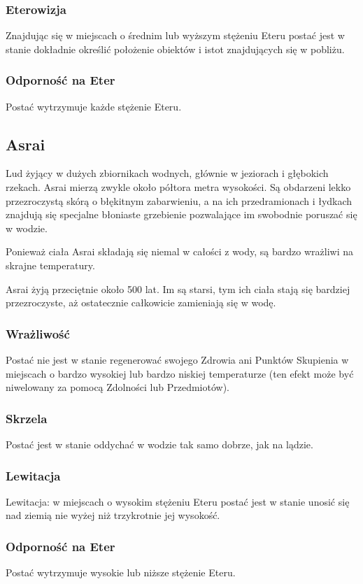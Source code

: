 \documentclass[10pt,a4paper]{book}
\begin{document}
\begin{multicols}{2}
\subsubsection*{Eterowizja}
Znajdując się w miejscach o średnim lub wyższym stężeniu Eteru postać jest w stanie dokładnie określić położenie obiektów i istot znajdujących się w pobliżu.

\subsubsection*{Odporność na Eter}
Postać wytrzymuje każde stężenie Eteru.




\subsection*{Asrai}
Lud żyjący w dużych zbiornikach wodnych, głównie w jeziorach i głębokich rzekach. Asrai mierzą zwykle około półtora metra wysokości. Są obdarzeni lekko przezroczystą skórą o błękitnym zabarwieniu, a na ich przedramionach i łydkach znajdują się specjalne błoniaste grzebienie pozwalające im swobodnie poruszać się w wodzie.

Ponieważ ciała Asrai składają się niemal w całości z wody, są bardzo wrażliwi na skrajne temperatury.

Asrai żyją przeciętnie około 500 lat. Im są starsi, tym ich ciała stają się bardziej przezroczyste, aż ostatecznie całkowicie zamieniają się w wodę.

\subsubsection*{Wrażliwość}
Postać nie jest w stanie regenerować swojego Zdrowia ani Punktów Skupienia w miejscach o bardzo wysokiej lub bardzo niskiej temperaturze (ten efekt może być niwelowany za pomocą Zdolności lub Przedmiotów).

\subsubsection*{Skrzela}
Postać jest w stanie oddychać w wodzie tak samo dobrze, jak na lądzie.

\subsubsection*{Lewitacja}
Lewitacja: w miejscach o wysokim stężeniu Eteru postać jest w stanie unosić się nad ziemią nie wyżej niż trzykrotnie jej wysokość.

\subsubsection*{Odporność na Eter}
Postać wytrzymuje wysokie lub niższe stężenie Eteru.


\end{multicols}
\end{document}
